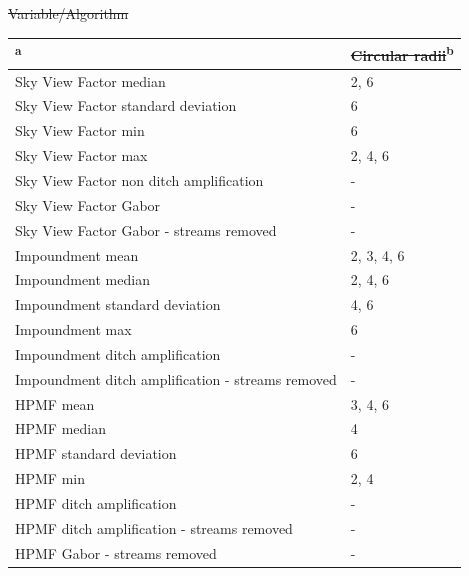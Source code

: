 \documentclass[11pt, review]{elsarticle} %
\providecommand{\DIFaddtex}[1]{{\protect\color{blue}\uwave{#1}}} %
\providecommand{\DIFdeltex}[1]{{\protect\color{red}\sout{#1}}}                      %
\providecommand{\DIFaddFL}[1]{\DIFadd{#1}} %
\providecommand{\DIFdelFL}[1]{\DIFdel{#1}} %
\providecommand{\DIFaddbeginFL}{} %
\providecommand{\DIFaddendFL}{} %
\providecommand{\DIFdelbeginFL}{} %
\providecommand{\DIFdelendFL}{} %
\providecommand{\DIFadd}[1]{\texorpdfstring{\DIFaddtex{#1}}{#1}} %
\providecommand{\DIFdel}[1]{\texorpdfstring{\DIFdeltex{#1}}{}} %
\begin{document}
\begin{table} [!htb]
\DIFdelbeginFL %
\DIFdelendFL \DIFaddbeginFL \centering
    \DIFaddendFL {\DIFdelbeginFL %
\DIFdelFL{Variable/Algorithm}\DIFdelendFL \DIFaddbeginFL \begin{tabular}{l|l}
      \textbf{\DIFaddFL{Terrain Index/Algorithm}}\DIFaddendFL \textsuperscript{a} & \DIFdelbeginFL \DIFdelFL{Circular radii}\DIFdelendFL \DIFaddbeginFL \textbf{\DIFaddFL{Circular radii}}\DIFaddendFL \textsuperscript{b} \\ \DIFdelbeginFL %

\DIFdelendFL %
      \DIFaddbeginFL \hline
      \DIFaddendFL Sky View Factor median &2, 6 \\
      Sky View Factor standard deviation & 6 \\
      Sky View Factor min & 6 \\
      Sky View Factor max & 2, 4, 6 \\
      Sky View Factor non ditch amplification & - \\ 
      Sky View Factor Gabor & - \\
      Sky View Factor Gabor - streams removed & -\\

      Impoundment mean & 2, 3, 4, 6 \\
      Impoundment median & 2, 4, 6 \\
      Impoundment standard deviation & 4, 6 \\
      Impoundment max & 6 \\
      Impoundment ditch amplification & - \\
      Impoundment ditch amplification - streams removed & - \\

      HPMF mean & 3, 4, 6 \\
      HPMF median & 4 \\
      HPMF standard deviation & 6 \\
      HPMF min & 2, 4 \\
      HPMF ditch amplification & - \\
      HPMF ditch amplification - streams removed & - \\
      HPMF Gabor - streams removed & -\\


\end{tabular}}
\end{table}
\end{document}
